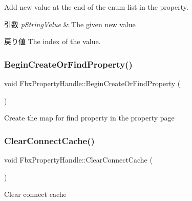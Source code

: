 Add new value at the end of the enum list in the property. 
\begin{DoxyParams}{引数}
{\em p\+String\+Value} & The given new value \\
\hline
\end{DoxyParams}
\begin{DoxyReturn}{戻り値}
The index of the value. 
\end{DoxyReturn}
\mbox{\label{class_fbx_property_handle_a1845e4c188e4557e44a1052c5d03d08f}} 
\subsubsection{\texorpdfstring{Begin\+Create\+Or\+Find\+Property()}{BeginCreateOrFindProperty()}}
{\footnotesize\ttfamily void Fbx\+Property\+Handle\+::\+Begin\+Create\+Or\+Find\+Property (\begin{DoxyParamCaption}{ }\end{DoxyParamCaption})}



Create the map for find property in the property page 

\mbox{\label{class_fbx_property_handle_a7c7d33409675381ba019ac3a2d67c372}} 
\subsubsection{\texorpdfstring{Clear\+Connect\+Cache()}{ClearConnectCache()}}
{\footnotesize\ttfamily void Fbx\+Property\+Handle\+::\+Clear\+Connect\+Cache (\begin{DoxyParamCaption}{ }\end{DoxyParamCaption})}



Clear connect cache 

\mbox{\label{class_fbx_property_handle_aae1fece6b331a3d0550df3258a89ac82}} 
